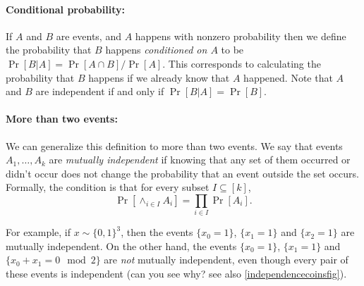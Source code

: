 \hypertarget{disjoint}{}

\paragraph{Conditional probability:} If \(A\) and \(B\) are events, and
\(A\) happens with nonzero probability then we define the probability
that \(B\) happens \emph{conditioned on \(A\)} to be
\(\Pr[B|A] = \Pr[A \cap B]/\Pr[A]\). This corresponds to calculating the
probability that \(B\) happens if we already know that \(A\) happened.
Note that \(A\) and \(B\) are independent if and only if
\(\Pr[B|A]=\Pr[B]\).

\paragraph{More than two events:} We can generalize this definition to
more than two events. We say that events \(A_1,\ldots,A_k\) are
\emph{mutually independent} if knowing that any set of them occurred or
didn't occur does not change the probability that an event outside the
set occurs. Formally, the condition is that for every subset
\(I \subseteq [k]\), \[
\Pr[ \wedge_{i\in I} A_i] =\prod_{i\in I} \Pr[A_i].
\]

For example, if \(x\sim \{0,1\}^3\), then the events \(\{ x_0=1 \}\),
\(\{ x_1 = 1\}\) and \(\{x_2 = 1 \}\) are mutually independent. On the
other hand, the events \(\{x_0 = 1 \}\), \(\{x_1 = 1\}\) and
\(\{ x_0 + x_1 = 0 \mod 2 \}\) are \emph{not} mutually independent, even
though every pair of these events is independent (can you see why? see
also \cref{independencecoinsfig}).

